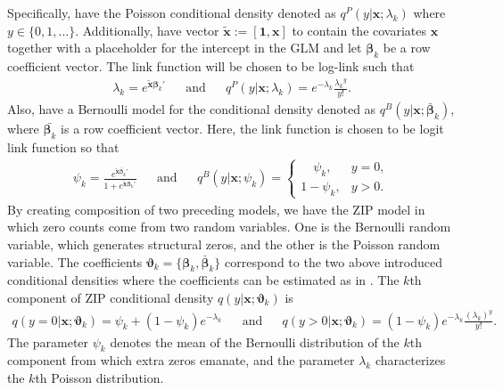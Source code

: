 \documentclass[12pt,letterpaper]{article}
\numberwithin{equation}{section}
\numberwithin{equation}{section}
\numberwithin{equation}{section}
\newcommand{\xTilda}{\tilde{\bm{x}}}
\begin{document}
Specifically, have the Poisson conditional density  denoted as $ q^P(y|\bm{x}; \lambda_k) $ where $y \in \{0,1,\dots\}$. Additionally, have vector $\xTilda := [\bm{1},\bm{x}]$ to contain the covariates $\bm{x}$ together with a placeholder for the intercept in the GLM and let $\bm{\beta}_k$ be a row coefficient vector.
The link function will be chosen to be log-link such that
 \begin{align}\label{g1link}
\lambda_k = e^{\xTilda \bm{\beta}_k'} && \text{and} & & %
q^P(y|\bm{ x} ; \lambda_{k} ) = e^{-\lambda_k} \frac{{\lambda_k}^y}{y!}.
 \end{align}
Also, have a Bernoulli model for the conditional density denoted as $ q^{B}(y|\bm{x}; \bm{\bar{\beta}}_k) $, where $\bar{\bm{\beta}_k}$ is a row coefficient vector.  Here, the link function is chosen to be logit link function so that
 \begin{align}\label{g2link}
 \psi_k =  \frac{e^{\xTilda \bm{\bar{\beta}}_k'}}{1+ e^{\xTilda  \bm{\bar{\beta}}_k'}}  && \text{and} && 
 q^B(y | \bm{x} ; {\psi}_k) = \begin{cases}
      \quad \psi_k, & y = 0,\\
     1 -  \psi_k,  & y > 0.
   \end{cases}
 \end{align}
By creating composition of two preceding models, we have the ZIP model in which zero counts come from two random variables. One is the Bernoulli random variable, which generates structural zeros, and the other is the Poisson random variable. The coefficients $\bm{\vartheta}_{k}=\{ \bm{\beta}_{k},  \bm{\bar{\beta}}_k \}$ correspond to the two above introduced conditional densities where the coefficients can be estimated as in \cite{Lambert}. The $k$th component of ZIP conditional density $q(y|\bm{x}; \bm{\vartheta}_{k}  )$ is %
 \begin{align*}
 q( y = 0| \bm{x} ; \bm{ \vartheta}_{k}  ) = \psi_k + (1 - \psi_k)e^{-\lambda_k}  & &  \text{and}  & &
q(y > 0 |  \bm{x} ; \bm{ \vartheta}_{k}  ) = (1 - \psi_k)e^{-\lambda_k} \frac{\left(\lambda_k \right)^y  }{y!}.
 \end{align*}
The parameter $\psi_k$ denotes the mean of the Bernoulli distribution of the $k$th component from which extra zeros emanate, and the parameter $ \lambda_k $ characterizes the $k$th Poisson distribution. 
\end{document}
